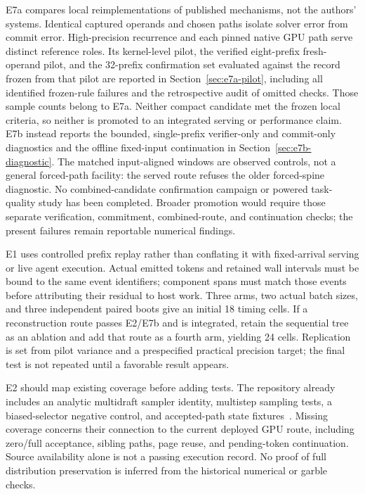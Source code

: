 \documentclass[conference]{IEEEtran}
\begin{document}
E7a compares local reimplementations of published mechanisms, not the authors' systems. Identical captured operands and chosen paths isolate solver error from commit error. High-precision recurrence and each pinned native GPU path serve distinct reference roles. Its kernel-level pilot, the verified eight-prefix fresh-operand pilot, and the 32-prefix confirmation set evaluated against the record frozen from that pilot are reported in Section~\ref{sec:e7a-pilot}, including all identified frozen-rule failures and the retrospective audit of omitted checks. Those sample counts belong to E7a. Neither compact candidate met the frozen local criteria, so neither is promoted to an integrated serving or performance claim. E7b instead reports the bounded, single-prefix verifier-only and commit-only diagnostics and the offline fixed-input continuation in Section~\ref{sec:e7b-diagnostic}. The matched input-aligned windows are observed controls, not a general forced-path facility: the served route refuses the older forced-spine diagnostic. No combined-candidate confirmation campaign or powered task-quality study has been completed. Broader promotion would require those separate verification, commitment, combined-route, and continuation checks; the present failures remain reportable numerical findings.

E1 uses controlled prefix replay rather than conflating it with fixed-arrival serving or live agent execution. Actual emitted tokens and retained wall intervals must be bound to the same event identifiers; component spans must match those events before attributing their residual to host work. Three arms, two actual batch sizes, and three independent paired boots give an initial 18 timing cells. If a reconstruction route passes E2/E7b and is integrated, retain the sequential tree as an ablation and add that route as a fourth arm, yielding 24 cells. Replication is set from pilot variance and a prespecified practical precision target; the final test is not repeated until a favorable result appears.

E2 should map existing coverage before adding tests. The repository already includes an analytic multidraft sampler identity, multistep sampling tests, a biased-selector negative control, and accepted-path state fixtures~\cite{lumo2026archive}. Missing coverage concerns their connection to the current deployed GPU route, including zero/full acceptance, sibling paths, page reuse, and pending-token continuation. Source availability alone is not a passing execution record. No proof of full distribution preservation is inferred from the historical numerical or garble checks.
\end{document}
